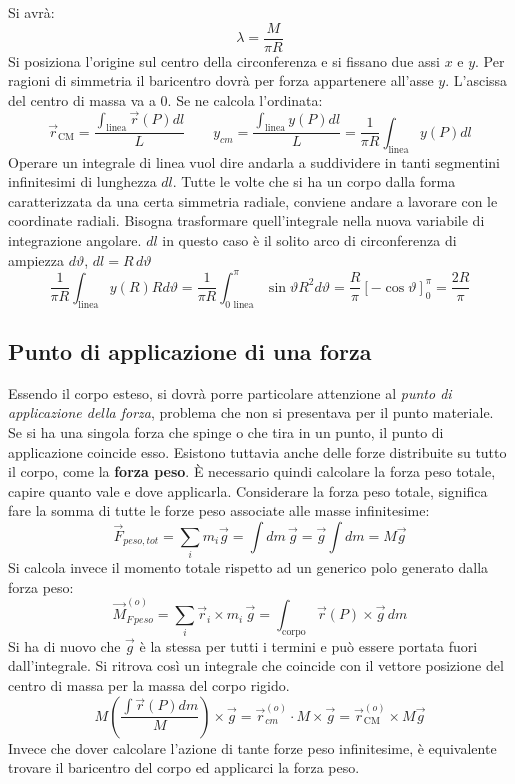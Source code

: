 \documentclass[10pt,a4paper]{book}
\begin{document}
\FloatBarrier
Si avrà:
\[
	\lambda = \frac{M}{\pi R}
\]
Si posiziona l'origine sul centro della circonferenza e si fissano due assi $x$ e $y$. Per ragioni di simmetria il baricentro dovrà per forza appartenere all'asse $y$. L'ascissa del centro di massa va a $0$. Se ne calcola l'ordinata:
\[
	\vec{r}_\text{CM} = \frac{\int_{\text{linea} } \vec{r} (P)dl}{L} \qquad y_{cm}=\frac{\int_{\text{linea} }y(P)dl}{L} = \frac{1}{\pi R} \int_{\text{linea} } y(P) dl
\]
Operare un integrale di linea vuol dire andarla a suddividere in tanti segmentini infinitesimi di lunghezza $dl$. Tutte le volte che si ha un corpo dalla forma caratterizzata da una certa simmetria radiale, conviene andare a lavorare con le coordinate radiali. Bisogna trasformare quell'integrale nella nuova variabile di integrazione angolare.
$dl$ in questo caso è il solito arco di circonferenza di ampiezza $d\vartheta$, $dl=R\,d\vartheta$
\[
	\frac{1}{\pi R}\int_{\text{linea}} y(R)Rd\vartheta = \frac{1}{\pi R}\int_{0\text{ linea} }^{\pi } \sin \vartheta R^2 d\vartheta = \frac{R}{\pi }[-\cos \vartheta ]_0^{\pi } = \frac{2R}{\pi}
\]

\subsection{Punto di applicazione di una forza}

Essendo il corpo esteso, si dovrà porre particolare attenzione al \emph{punto di applicazione della forza}, problema che non si presentava per il punto materiale. Se si ha una singola forza che spinge o che tira in un punto, il punto di applicazione coincide esso. Esistono tuttavia anche delle forze distribuite su tutto il corpo, come la \textbf{forza peso}. È necessario quindi calcolare la forza peso totale, capire quanto vale e dove applicarla.
Considerare la forza peso totale, significa fare la somma di tutte le forze peso associate alle masse infinitesime:
\[
	\vec{F}_{peso,tot} = \sum_i m_i\vec{g} = \int dm\,\vec{g} = \vec{g} \int dm = M\vec{g}
\]
Si calcola invece il momento totale rispetto ad un generico polo generato dalla forza peso:
\[
	\vec{M}^{(o)}_{F\,peso} = \sum_i \vec{r}_i \times m_i\,\vec{g} = \int_{\text{corpo}}\vec{r} (P)\times \vec{g} \,dm
\]
Si ha di nuovo che $\vec{g}$ è la stessa per tutti i termini e può essere portata fuori dall'integrale. Si ritrova così un integrale che coincide con il vettore posizione del centro di massa per la massa del corpo rigido.
\[
	M\left( \frac{\int\vec{r} (P)dm}{M} \right) \times \vec{g} = \vec{r}_{cm}^{(o)}\cdot M \times \vec{g} = \vec{r}_\text{CM}^{(o)} \times M\vec{g}
\]
Invece che dover calcolare l'azione di tante forze peso infinitesime,  è equivalente trovare il baricentro del corpo ed applicarci la forza peso.
\end{document}
